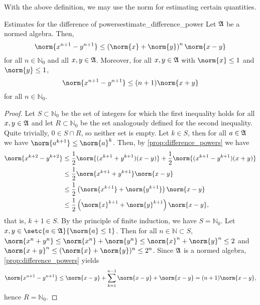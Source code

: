 With the above definition, we may use the norm for estimating certain quantities.
\begin{lemma}{Estimates for the difference of powers}{estimate_difference_power}
    Let \(\mathfrak{A}\) be a normed algebra. Then,
    \begin{equation*}
        \norm{x^{n+1} - y^{n+1}}\leq \left(\norm{x} + \norm{y}\right)^n \norm{x-y}
    \end{equation*}
    for all \(n \in \mathbb{N}_0\) and all \(x,y \in \mathfrak{A}\). Moreover, for all \(x, y \in \mathfrak{A}\) with \(\norm{x} \leq 1\) and \(\norm{y} \leq 1\),
    \begin{equation*}
        \norm{x^{n+1} - y^{n+1}} \leq (n+1)\norm{x+y}
    \end{equation*}
    for all \(n \in \mathbb{N}_0\).
\end{lemma}
\begin{proof}
    Let \(S\subset \mathbb{N}_0\) be the set of integers for which the first inequality holds for all \(x, y \in \mathfrak{A}\) and let \(R \subset \mathbb{N}_0\) be the set analogously defined for the second inequality. Quite trivially, \(0 \in S \cap R\), so neither set is empty. Let \(k \in S\), then for all \(a \in \mathfrak{A}\) we have \(\norm{a^{k+1}} \leq \norm{a}^k\). Then, by \cref{prop:difference_powers} we have
    \begin{align*}
        \norm{x^{k+2} - y^{k+2}} &\leq \frac12 \norm{(x^{k+1} + y^{k+1})(x - y)} + \frac12\norm{(x^{k+1} - y^{k+1})(x+y)}\\
                                 &\leq \frac12 \norm{x^{k+1} + y^{k+1}} \norm{x - y}\\
                                 &\leq \frac12\left(\norm{x^{k+1}} + \norm{y^{k+1}}\right)\norm{x - y}\\
                                 &\leq \frac12\left(\norm{x}^{k+1} + \norm{y}^{k+1}\right)\norm{x - y},
    \end{align*}
    that is, \(k + 1 \in S\). By the principle of finite induction, we have \(S = \mathbb{N}_0\). Let \(x, y \in \setc{a \in \algebra{A}}{\norm{a} \leq 1}\). Then for all \(n \in \mathbb{N} \subset S\), \(\norm{x^n + y^n} \leq \norm{x^n} + \norm{y^n} \leq \norm{x}^n + \norm{y}^n\leq 2\) and \(\norm{x + y}^n \leq (\norm{x} + \norm{y})^n \leq 2^n\). Since \(\mathfrak{A}\) is a normed algebra, \cref{prop:difference_powers} yields
    \begin{equation*}
        \norm{x^{n+1} - y^{n+1}} \leq \norm{x - y} + \sum_{k=1}^{n-1} \norm{x-y} + \norm{x-y} = (n+1)\norm{x-y},
    \end{equation*}
    hence \(R = \mathbb{N}_0\).
\end{proof}


